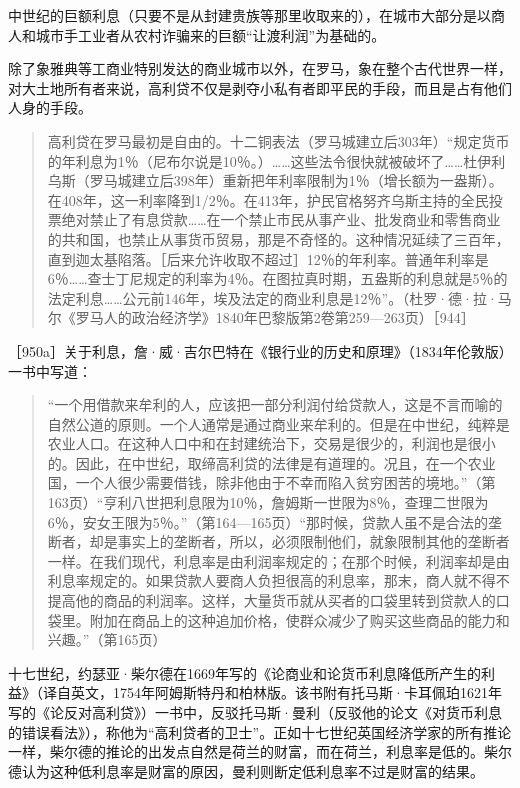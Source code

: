 中世纪的巨额利息（只要不是从封建贵族等那里收取来的），在城市大部分是以商人和城市手工业者从农村诈骗来的巨额“让渡利润”为基础的。

除了象雅典等工商业特别发达的商业城市以外，在罗马，象在整个古代世界一样，对大土地所有者来说，高利贷不仅是剥夺小私有者即平民的手段，而且是占有他们人身的手段。

\begin{quote}{高利贷在罗马最初是自由的。十二铜表法（罗马城建立后303年）“规定货币的年利息为1％（尼布尔说是10％。）……这些法令很快就被破坏了……杜伊利乌斯（罗马城建立后398年）重新把年利率限制为1％（增长额为一盎斯）。在408年，这一利率降到1/2％。在413年，护民官格努齐乌斯主持的全民投票绝对禁止了有息贷款……在一个禁止市民从事产业、批发商业和零售商业的共和国，也禁止从事货币贸易，那是不奇怪的。这种情况延续了三百年，直到迦太基陷落。［后来允许收取不超过］12％的年利率。普通年利率是6％……查士丁尼规定的利率为4％。在图拉真时期，五盎斯的利息就是5％的法定利息……公元前146年，埃及法定的商业利息是12％”。（杜罗·德·拉·马尔《罗马人的政治经济学》1840年巴黎版第2卷第259—263页）［944］}\end{quote}


［950a］关于利息，詹·威·吉尔巴特在《银行业的历史和原理》（1834年伦敦版）一书中写道：

\begin{quote}{“一个用借款来牟利的人，应该把一部分利润付给贷款人，这是不言而喻的自然公道的原则。一个人通常是通过商业来牟利的。但是在中世纪，纯粹是农业人口。在这种人口中和在封建统治下，交易是很少的，利润也是很小的。因此，在中世纪，取缔高利贷的法律是有道理的。况且，在一个农业国，一个人很少需要借钱，除非他由于不幸而陷入贫穷困苦的境地。”（第163页）“亨利八世把利息限为10％，詹姆斯一世限为8％，查理二世限为6％，安女王限为5％。”（第164—165页）“那时候，贷款人虽不是合法的垄断者，却是事实上的垄断者，所以，必须限制他们，就象限制其他的垄断者一样。在我们现代，利息率是由利润率规定的；在那个时候，利润率却是由利息率规定的。如果贷款人要商人负担很高的利息率，那末，商人就不得不提高他的商品的利润率。这样，大量货币就从买者的口袋里转到贷款人的口袋里。附加在商品上的这种追加价格，使群众减少了购买这些商品的能力和兴趣。”（第165页）}\end{quote}

十七世纪，约瑟亚·柴尔德在1669年写的《论商业和论货币利息降低所产生的利益》（译自英文，1754年阿姆斯特丹和柏林版。该书附有托马斯·卡耳佩珀1621年写的《论反对高利贷》）一书中，反驳托马斯·曼利（反驳他的论文《对货币利息的错误看法》），称他为“高利贷者的卫士”。正如十七世纪英国经济学家的所有推论一样，柴尔德的推论的出发点自然是荷兰的财富，而在荷兰，利息率是低的。柴尔德认为这种低利息率是财富的原因，曼利则断定低利息率不过是财富的结果。

